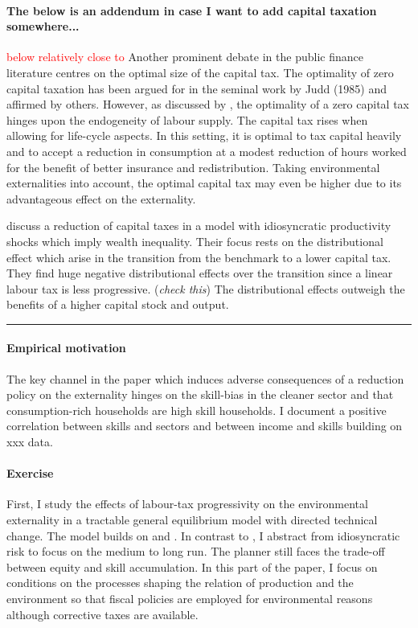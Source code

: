 \documentclass[12pt]{article}
\newcommand{\tr}[1]{\textcolor{red}{#1}}
\begin{document}
\paragraph{The below is an addendum in case I want to add capital taxation somewhere...} \tr{below relatively close to \cite{Conesa2009TaxingAll}} 
Another prominent debate in the public finance literature centres on the optimal size of the capital tax. The optimality of zero capital taxation has been argued for in the seminal work by Judd (1985) and affirmed by others.  However, as discussed by \cite{Conesa2009TaxingAll}, the optimality of a zero capital tax hinges upon the endogeneity of labour supply. The capital tax rises when allowing for life-cycle aspects. In this setting, it is optimal to tax capital heavily and to accept a reduction in consumption at a modest reduction of hours worked for the benefit of better insurance and redistribution. Taking environmental externalities into account, the optimal capital tax may even be higher due to its advantageous effect on the externality.

\cite{Domeij2004OnTaxes} discuss a reduction of capital taxes in a model with idiosyncratic productivity shocks which imply  wealth inequality. Their focus rests on the distributional effect which arise in the transition from the benchmark to a lower capital tax. They find huge negative distributional effects over the transition since a linear labour tax is less progressive.  (\textit{check this}) The distributional effects outweigh the benefits of a higher capital stock and output. 
\\

\noindent\rule[1ex]{\textwidth}{1pt}

\paragraph{Empirical motivation}
The key channel in the paper which induces adverse consequences of a reduction policy on the externality hinges on the skill-bias in the cleaner sector and that consumption-rich households are high skill households. I document a positive correlation between skills and sectors and between income and skills building on xxx data.

\paragraph{Exercise}
First, I study the effects of labour-tax progressivity  on the environmental externality in a tractable general equilibrium model with directed technical change. The model builds on \cite{Heathcote2017OptimalFramework} and \cite{Acemoglu2012TheChange}. 
In contrast to \cite{Heathcote2017OptimalFramework}, I abstract from idiosyncratic risk to focus on the medium to long run. 
The planner still faces the trade-off between equity and skill accumulation. 
In this part of the paper, I focus on conditions on the processes shaping the relation of production and the environment so that fiscal policies are employed for environmental reasons although corrective taxes are available.  
\end{document}
